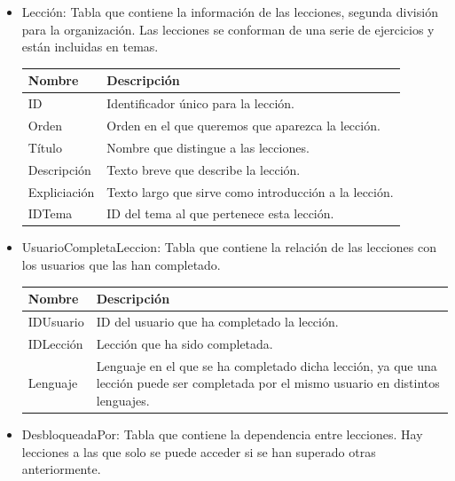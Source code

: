 \begin{itemize}
\item Lección: Tabla que contiene la información de las lecciones, segunda división para la organización. Las lecciones se conforman de una serie de ejercicios y están incluidas en temas.

\begin{tabularx}{14cm}{|l|X|}
\hline
\textbf{Nombre} & \textbf{Descripción}                                                              \\ \hline
ID              & Identificador único para la lección.                                         \\ \hline
Orden        & Orden en el que queremos que aparezca la lección. \\ \hline
Título      & Nombre que distingue a las lecciones. \\ \hline
Descripción              & Texto breve que describe la lección.                                         \\ \hline
Expliciación        & Texto largo que sirve como introducción a la lección.  \\ \hline
IDTema      & ID del tema al que pertenece esta lección. \\ \hline
\end{tabularx}
\vspace{1em}

\item UsuarioCompletaLeccion: Tabla que contiene la relación de las lecciones con los usuarios que las han completado.

\begin{tabularx}{14cm}{|l|X|}
\hline
\textbf{Nombre} & \textbf{Descripción}                                                              \\ \hline
IDUsuario       & ID del usuario que ha completado la lección.                                                          \\ \hline
IDLección     & Lección que ha sido completada.                                           \\ \hline
Lenguaje            & Lenguaje en el que se ha completado dicha lección, ya que una lección puede ser completada por el mismo usuario en distintos lenguajes. \\ \hline
\end{tabularx}
\vspace{1em}

\item DesbloqueadaPor: Tabla que contiene la dependencia entre lecciones. Hay lecciones a las que solo se puede acceder si se han superado otras anteriormente.


\end{itemize}
